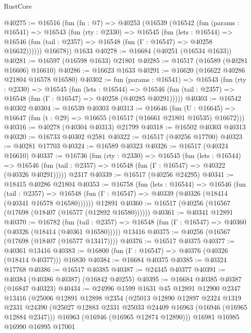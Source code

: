 \begin{lexlean}{RustCore}
\begin{coremodule}
@40275 := @16516
    (fun (fn : @7) =>
    @40253
      (@16539
        (@16542
          (fun (params : @16541) =>
          @16543
            (fun (rty : @2330) =>
            @16545
              (fun (lets : @16544) =>
              @16546 (fun (tail : @2357) => @16548 (fun (Γ : @16547) => @40258 @16632))))))
        @16678))
    @1633
@40278 := @16684 (@40251 (@16534 @1633))
@40281 := @16597 (@16598 @1633) @21801
@40285 := @16517 (@16589 (@40281 @16606) @16610)
@40286 := @16623 @1633
@40291 := @16620 (@16622 @40286 @21804 @16578 @16580)
@40302 := fun (params : @16541) =>
  @16543
    (fun (rty : @2330) =>
    @16545
      (fun (lets : @16544) =>
      @16546 (fun (tail : @2357) => @16548 (fun (Γ : @16547) => @40258 (@40285 @40291)))))
@40303 := @16542 @40302
@40304 := @16539 @40303
@40313 := @16646
    (fun (U : @16645) => @16647 (fun (t : @29) => @16655 (@16517 (@16661 @21801 @16535) @16672)))
@40316 := @40278 (@40304 @40313) @21799
@40318 := @16502 @40303 @40313
@40320 := @16733 @40302 @2581
@40322 := @16517 (@40256 @17700)
@40323 := @40281 @17703
@40324 := @16589 @40323
@40326 := @16517 (@40324 @16610)
@40337 := @16736
    (fun (rty : @2330) =>
    @16545
      (fun (lets : @16544) =>
      @16546 (fun (tail : @2357) => @16548 (fun (Γ : @16547) => @40322 (@40326 @40291)))))
    @2317
@40339 := @16517 (@40256 @24295)
@40341 := @18415 @40286 @21804
@40353 := @16758
    (fun (lets : @16544) =>
    @16546
      (fun (tail : @2357) =>
      @16548 (fun (Γ : @16547) => @40339 (@40326 (@18414 (@40341 @16578 @16580))))))
    @12891
@40360 := @16517 (@40256 (@16567 (@17698 (@18407 (@16577 (@12892 @16580))))))
@40361 := @40341 @12891
@40370 := @16782
    (fun (tail : @2357) => @16548 (fun (Γ : @16547) => @40360 (@40326 (@18414 (@40361 @16580)))))
    @13416
@40375 := @40256 (@16567 (@17698 (@18407 (@16577 @13417))))
@40376 := @16517 @40375
@40377 := @40361 @13416
@40383 := @16800 (fun (Γ : @16547) => @40376 (@40326 (@18414 @40377))) @16830
@40384 := @16684 @40375
@40385 := @40324 @17768
@40386 := @16517 @40385
@40387 := @24345 @40377
@40391 := @40384 (@40386 @40387) (@16842 @40255)
@40395 := @16684 @40385 @40387 (@16847 @40323)
@40434 := @24996
    @1599
    @1631
    @45
    @12891
    @12900
    @2347
    @13416
    (@25006
      @12891
      @12898
      @2354
      (@25013
        @12890
        @12897
        @2324
        @1319
        @2331
        @24390
        (@25027 @12883 @2331 @25033 @24409 @16963 (@16946 (@16965 @12884 @2347)))
        @16963
        (@16946 (@16965 @12874 @12890)))
      @16981
      @16985
      @16990
      @16995
      @17001

\end{coremodule}
\end{lexlean}
